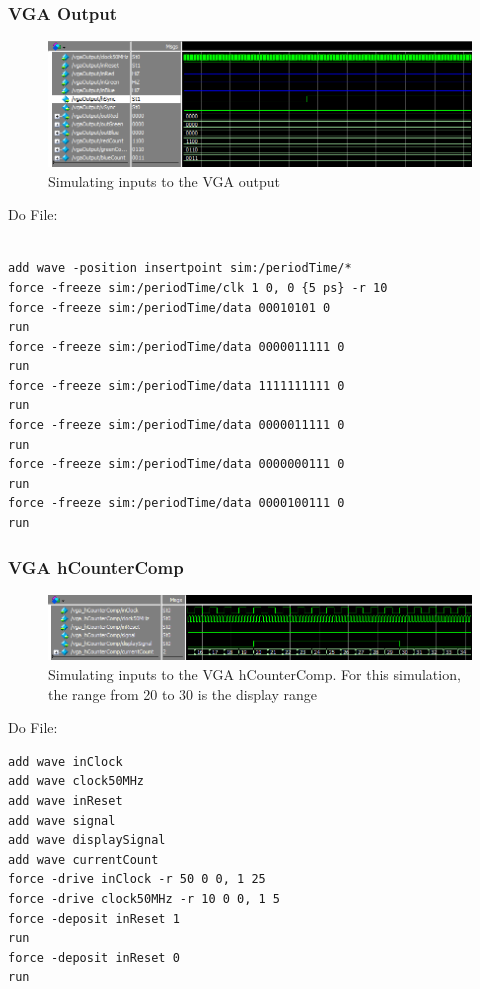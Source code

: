 \documentclass[a4paper]{article}
\begin{document}
\subsubsection{VGA Output}

\begin{figure}[H]
    \includegraphics[width=0.8 \linewidth]{images/vgaOutputSim.png}
    \caption{Simulating inputs to the VGA output}
    \label{vgaOutputSim}
\end{figure}

Do File:

\begin{Verbatim}

add wave -position insertpoint sim:/periodTime/*
force -freeze sim:/periodTime/clk 1 0, 0 {5 ps} -r 10
force -freeze sim:/periodTime/data 00010101 0
run
force -freeze sim:/periodTime/data 0000011111 0
run
force -freeze sim:/periodTime/data 1111111111 0
run
force -freeze sim:/periodTime/data 0000011111 0
run
force -freeze sim:/periodTime/data 0000000111 0
run
force -freeze sim:/periodTime/data 0000100111 0
run

\end{Verbatim}

\subsubsection{VGA hCounterComp}

\begin{figure}[H]
    \includegraphics[width=0.8 \linewidth]{images/vgaHCounterCompSim.png}
    \caption{Simulating inputs to the VGA hCounterComp. For this simulation, the range from 20 to 30 is the display range}
    \label{vgaHCounterCompSim}
\end{figure}

Do File:

\begin{Verbatim}
add wave inClock
add wave clock50MHz
add wave inReset
add wave signal
add wave displaySignal
add wave currentCount
force -drive inClock -r 50 0 0, 1 25
force -drive clock50MHz -r 10 0 0, 1 5
force -deposit inReset 1
run
force -deposit inReset 0
run
\end{Verbatim}
\end{document}
